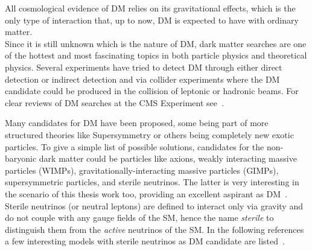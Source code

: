 All cosmological evidence of DM relies on its gravitational effects, which is the only type of interaction that, up to now, DM is expected to have with ordinary matter.\\
Since it is still unknown which is the nature of DM, dark matter searches are one of the hottest and most fascinating topics in both particle physics and theoretical physics. Several experiments have tried to detect DM through either direct detection or indirect detection and via collider experiments where the DM candidate could be produced in the collision of leptonic or hadronic beams. For clear reviews of DM searches at the CMS Experiment see~\cite{LOWETTE2016503,Bhawna_Gomber}.

Many candidates for DM have been proposed, some being part of more structured theories like Supersymmetry or others being completely new exotic particles. To give a simple list of possible solutions, candidates for the non-baryonic dark matter could be particles like axions, weakly interacting massive particles (WIMPs),  gravitationally-interacting massive particles (GIMPs), supersymmetric particles, and sterile neutrinos. The latter is very interesting in the scenario of this thesis work too, providing an excellent aspirant as DM~\cite{DREWES2017250,Cline_2020}. Sterile neutrinos (or neutral leptons) are defined to interact only via gravity and do not couple with any gauge fields of the SM, hence the name \emph{sterile} to distinguish them from the \emph{active} neutrinos of the SM. In the following references a few interesting models with sterile neutrinos as DM candidate are listed~\cite{Davidson_2008,PhysRevLett.72.17,PhysRevD.64.023501,KUSENKO20091,DOLGOV2002339}.


